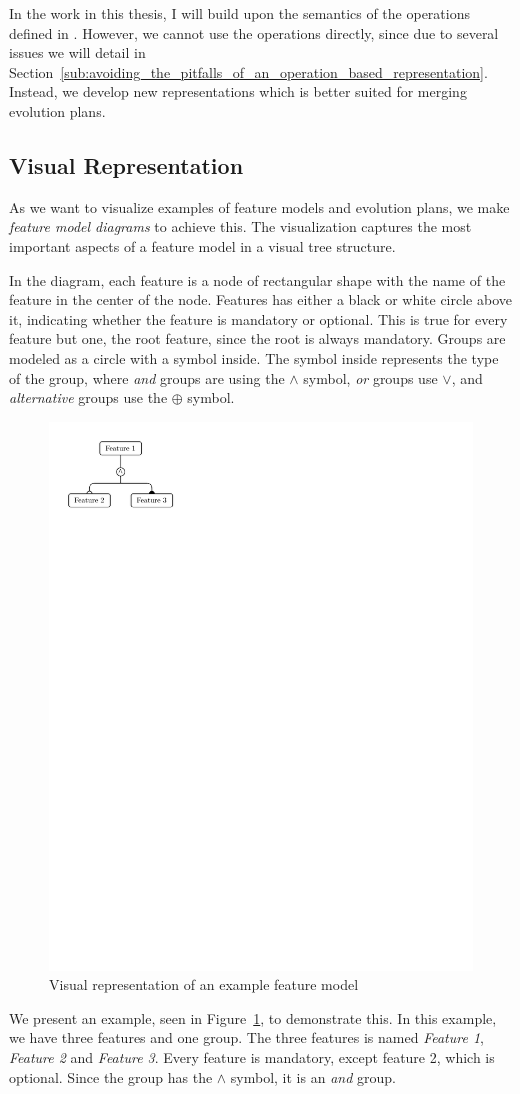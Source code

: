 \documentclass[a4paper,english]{ifimaster}
\begin{document}
In the work in this thesis, I will build upon the semantics of the operations defined in \cite{cite:consistency_preserving_evolution_planning}. However, we cannot use the operations directly, since due to several issues we will detail in Section~\vref{sub:avoiding_the_pitfalls_of_an_operation_based_representation}. Instead, we develop new representations which is better suited for merging evolution plans.

\subsection{Visual Representation}%
\label{sub:visual_representation}

As we want to visualize examples of feature models and evolution plans, we make \textit{feature model diagrams} to achieve this. The visualization captures the most important aspects of a feature model in a visual tree structure.

In the diagram, each feature is a node of rectangular shape with the name of the feature in the center of the node. Features has either a black or white circle above it, indicating whether the feature is mandatory or optional. This is true for every feature but one, the root feature, since the root is always mandatory. Groups are modeled as a circle with a symbol inside. The symbol inside represents the type of the group, where \textit{and} groups are using the $\land$ symbol, \textit{or} groups use $\lor$, and \textit{alternative} groups use the $\oplus$ symbol.

\begin{figure}[htpb]
  \centering
  \includegraphics[width=0.4\linewidth]{visual_example.pdf}
  \caption{Visual representation of an example feature model}%
  \label{fig:visual_example}
\end{figure}

We present an example, seen in Figure~\ref{fig:visual_example}, to demonstrate this. In this example, we have three features and one group. The three features is named \textit{Feature 1}, \textit{Feature 2} and \textit{Feature 3}. Every feature is mandatory, except feature 2, which is optional. Since the group has the $\land$ symbol, it is an \textit{and} group.
\end{document}
